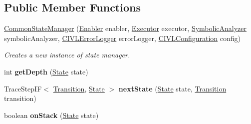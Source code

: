 \subsection*{Public Member Functions}
\begin{DoxyCompactItemize}
\item 
\hyperlink{classedu_1_1udel_1_1cis_1_1vsl_1_1civl_1_1kripke_1_1common_1_1CommonStateManager_ab593438d14a6ece3b12997c4fff2dfa0}{Common\+State\+Manager} (\hyperlink{interfaceedu_1_1udel_1_1cis_1_1vsl_1_1civl_1_1kripke_1_1IF_1_1Enabler}{Enabler} enabler, \hyperlink{interfaceedu_1_1udel_1_1cis_1_1vsl_1_1civl_1_1semantics_1_1IF_1_1Executor}{Executor} executor, \hyperlink{interfaceedu_1_1udel_1_1cis_1_1vsl_1_1civl_1_1semantics_1_1IF_1_1SymbolicAnalyzer}{Symbolic\+Analyzer} symbolic\+Analyzer, \hyperlink{classedu_1_1udel_1_1cis_1_1vsl_1_1civl_1_1log_1_1IF_1_1CIVLErrorLogger}{C\+I\+V\+L\+Error\+Logger} error\+Logger, \hyperlink{classedu_1_1udel_1_1cis_1_1vsl_1_1civl_1_1config_1_1IF_1_1CIVLConfiguration}{C\+I\+V\+L\+Configuration} config)
\begin{DoxyCompactList}\small\item\em Creates a new instance of state manager. \end{DoxyCompactList}\item 
\hypertarget{classedu_1_1udel_1_1cis_1_1vsl_1_1civl_1_1kripke_1_1common_1_1CommonStateManager_aeb86dbb321d531c74d5287dcd4019f7b}{}int {\bfseries get\+Depth} (\hyperlink{interfaceedu_1_1udel_1_1cis_1_1vsl_1_1civl_1_1state_1_1IF_1_1State}{State} state)\label{classedu_1_1udel_1_1cis_1_1vsl_1_1civl_1_1kripke_1_1common_1_1CommonStateManager_aeb86dbb321d531c74d5287dcd4019f7b}

\item 
\hypertarget{classedu_1_1udel_1_1cis_1_1vsl_1_1civl_1_1kripke_1_1common_1_1CommonStateManager_ac76d414f0e7f2f4ea14007d3a98928bf}{}Trace\+Step\+I\+F$<$ \hyperlink{interfaceedu_1_1udel_1_1cis_1_1vsl_1_1civl_1_1semantics_1_1IF_1_1Transition}{Transition}, \hyperlink{interfaceedu_1_1udel_1_1cis_1_1vsl_1_1civl_1_1state_1_1IF_1_1State}{State} $>$ {\bfseries next\+State} (\hyperlink{interfaceedu_1_1udel_1_1cis_1_1vsl_1_1civl_1_1state_1_1IF_1_1State}{State} state, \hyperlink{interfaceedu_1_1udel_1_1cis_1_1vsl_1_1civl_1_1semantics_1_1IF_1_1Transition}{Transition} transition)\label{classedu_1_1udel_1_1cis_1_1vsl_1_1civl_1_1kripke_1_1common_1_1CommonStateManager_ac76d414f0e7f2f4ea14007d3a98928bf}

\item 
\hypertarget{classedu_1_1udel_1_1cis_1_1vsl_1_1civl_1_1kripke_1_1common_1_1CommonStateManager_acc6b8d1115c2caee8abad34e529a8f04}{}boolean {\bfseries on\+Stack} (\hyperlink{interfaceedu_1_1udel_1_1cis_1_1vsl_1_1civl_1_1state_1_1IF_1_1State}{State} state)\label{classedu_1_1udel_1_1cis_1_1vsl_1_1civl_1_1kripke_1_1common_1_1CommonStateManager_acc6b8d1115c2caee8abad34e529a8f04}


\end{DoxyCompactItemize}
